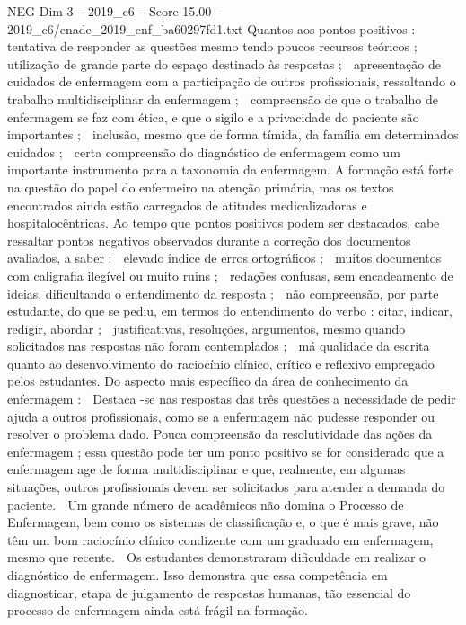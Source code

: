 \begin{textsample}{NEG Dim 3 – 2019\_c6 – Score 15.00 – 2019\_c6/enade\_2019\_enf\_ba60297fd1.txt}
Quantos aos pontos positivos :  tentativa de responder as questões mesmo tendo poucos recursos teóricos ;  utilização de grande parte do espaço destinado às respostas ;  apresentação de cuidados de enfermagem com a participação de outros profissionais, ressaltando o trabalho multidisciplinar da enfermagem ;  compreensão de que o trabalho de enfermagem se faz com ética, e que o sigilo e a privacidade do paciente são importantes ;  inclusão, mesmo que de forma tímida, da família em determinados cuidados ;  certa compreensão do diagnóstico de enfermagem como um importante instrumento para a taxonomia da enfermagem.
A formação está forte na questão do papel do enfermeiro na atenção primária, mas os textos encontrados ainda estão carregados de atitudes medicalizadoras e hospitalocêntricas.
Ao tempo que pontos positivos podem ser destacados, cabe ressaltar pontos negativos observados durante a correção dos documentos avaliados, a saber :  elevado índice de erros ortográficos ;  muitos documentos com caligrafia ilegível ou muito ruins ;  redações confusas, sem encadeamento de ideias, dificultando o entendimento da resposta ;  não compreensão, por parte estudante, do que se pediu, em termos do entendimento do verbo : citar, indicar, redigir, abordar ;  justificativas, resoluções, argumentos, mesmo quando solicitados nas respostas não foram contemplados ;  má qualidade da escrita quanto ao desenvolvimento do raciocínio clínico, crítico e reflexivo empregado pelos estudantes.
Do aspecto mais específico da área de conhecimento da enfermagem :  Destaca -se nas respostas das três questões a necessidade de pedir ajuda a outros profissionais, como se a enfermagem não pudesse responder ou resolver o problema dado.
Pouca compreensão da resolutividade das ações da enfermagem ; essa questão pode ter um ponto positivo se for considerado que a enfermagem age de forma multidisciplinar e que, realmente, em algumas situações, outros profissionais devem ser solicitados para atender a demanda do paciente.  Um grande número de acadêmicos não domina o Processo de Enfermagem, bem como os sistemas de classificação e, o que é mais grave, não têm um bom raciocínio clínico condizente com um graduado em enfermagem, mesmo que recente.  Os estudantes demonstraram dificuldade em realizar o diagnóstico de enfermagem.
Isso demonstra que essa competência em diagnosticar, etapa de julgamento de respostas humanas, tão essencial do processo de enfermagem ainda está frágil na formação.

\end{textsample}
